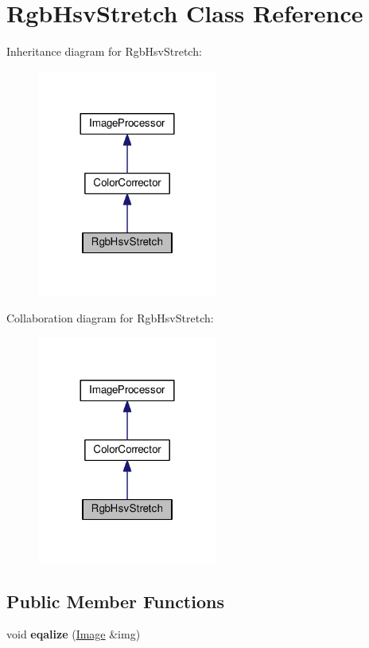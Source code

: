 \hypertarget{classRgbHsvStretch}{}\section{Rgb\+Hsv\+Stretch Class Reference}
\label{classRgbHsvStretch}


Inheritance diagram for Rgb\+Hsv\+Stretch\+:\nopagebreak
\begin{figure}[H]
\begin{center}
\leavevmode
\includegraphics[width=168pt]{classRgbHsvStretch__inherit__graph}
\end{center}
\end{figure}


Collaboration diagram for Rgb\+Hsv\+Stretch\+:\nopagebreak
\begin{figure}[H]
\begin{center}
\leavevmode
\includegraphics[width=168pt]{classRgbHsvStretch__coll__graph}
\end{center}
\end{figure}
\subsection*{Public Member Functions}
\begin{DoxyCompactItemize}
\item 
void {\bfseries eqalize} (\hyperlink{classImage}{Image} \&img)\hypertarget{classRgbHsvStretch_a0cce37f7610e19c8ca6964f86b0015ae}{}\label{classRgbHsvStretch_a0cce37f7610e19c8ca6964f86b0015ae}

\end{DoxyCompactItemize}
